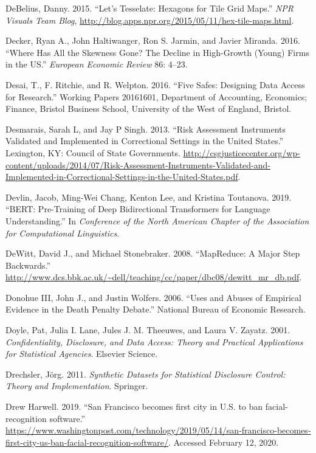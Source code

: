 \documentclass[]{krantz}
\begin{document}
\hypertarget{ref-DeBelius2015}{}
DeBelius, Danny. 2015. ``Let's Tesselate: Hexagons for Tile Grid Maps.''
\emph{NPR Visuals Team Blog},
\url{http://blog.apps.npr.org/2015/05/11/hex-tile-maps.html}.

\hypertarget{ref-decker2015has}{}
Decker, Ryan A., John Haltiwanger, Ron S. Jarmin, and Javier Miranda.
2016. ``Where Has All the Skewness Gone? The Decline in High-Growth
(Young) Firms in the US.'' \emph{European Economic Review} 86: 4--23.

\hypertarget{ref-desaietal2016}{}
Desai, T., F. Ritchie, and R. Welpton. 2016. ``Five Safes: Designing
Data Access for Research.'' Working Papers 20161601, Department of
Accounting, Economics; Finance, Bristol Business School, University of
the West of England, Bristol.

\hypertarget{ref-desmarais2013}{}
Desmarais, Sarah L, and Jay P Singh. 2013. ``Risk Assessment Instruments
Validated and Implemented in Correctional Settings in the United
States.'' Lexington, KY: Council of State Governments.
\url{http://csgjusticecenter.org/wp-content/uploads/2014/07/Risk-Assessment-Instruments-Validated-and-Implemented-in-Correctional-Settings-in-the-United-States.pdf}.

\hypertarget{ref-devlin-18}{}
Devlin, Jacob, Ming-Wei Chang, Kenton Lee, and Kristina Toutanova. 2019.
``BERT: Pre-Training of Deep Bidirectional Transformers for Language
Understanding.'' In \emph{Conference of the North American Chapter of
the Association for Computational Linguistics}.

\hypertarget{ref-MapReduceBad}{}
DeWitt, David J., and Michael Stonebraker. 2008. ``MapReduce: A Major
Step Backwards.''
\url{http://www.dcs.bbk.ac.uk/~dell/teaching/cc/paper/dbc08/dewitt_mr_db.pdf}.

\hypertarget{ref-donohue2006uses}{}
Donohue III, John J., and Justin Wolfers. 2006. ``Uses and Abuses of
Empirical Evidence in the Death Penalty Debate.'' National Bureau of
Economic Research.

\hypertarget{ref-doyle2001confidentiality}{}
Doyle, Pat, Julia I. Lane, Jules J. M. Theeuwes, and Laura V. Zayatz.
2001. \emph{Confidentiality, Disclosure, and Data Access: Theory and
Practical Applications for Statistical Agencies}. Elsevier Science.

\hypertarget{ref-drechsler2011synthetic}{}
Drechsler, Jörg. 2011. \emph{Synthetic Datasets for Statistical
Disclosure Control: Theory and Implementation}. Springer.

\hypertarget{ref-harwell2019}{}
Drew Harwell. 2019. ``San Francisco becomes first city in U.S. to ban
facial-recognition software.''
\url{https://www.washingtonpost.com/technology/2019/05/14/san-francisco-becomes-first-city-us-ban-facial-recognition-software/}.
Accessed February 12, 2020.
\end{document}
